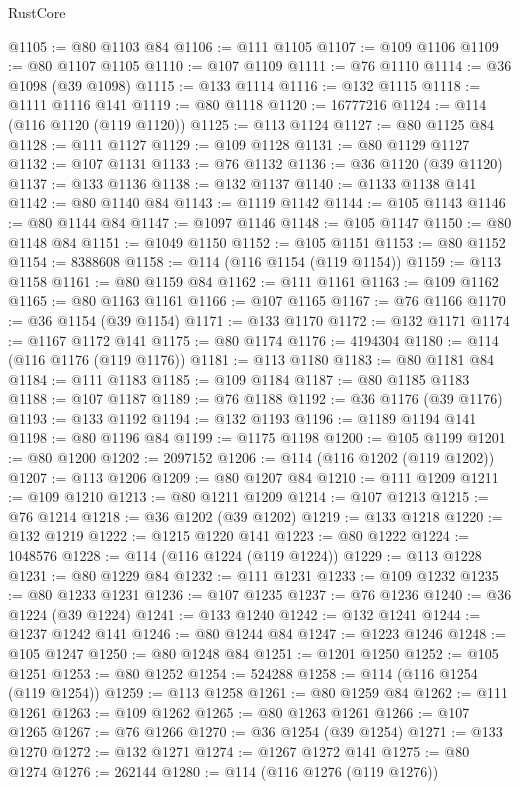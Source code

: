 \begin{lexlean}{RustCore}
\begin{coremodule}
@1105 := @80 @1103 @84
@1106 := @111 @1105
@1107 := @109 @1106
@1109 := @80 @1107 @1105
@1110 := @107 @1109
@1111 := @76 @1110
@1114 := @36 @1098 (@39 @1098)
@1115 := @133 @1114
@1116 := @132 @1115
@1118 := @1111 @1116 @141
@1119 := @80 @1118
@1120 := 16777216
@1124 := @114 (@116 @1120 (@119 @1120))
@1125 := @113 @1124
@1127 := @80 @1125 @84
@1128 := @111 @1127
@1129 := @109 @1128
@1131 := @80 @1129 @1127
@1132 := @107 @1131
@1133 := @76 @1132
@1136 := @36 @1120 (@39 @1120)
@1137 := @133 @1136
@1138 := @132 @1137
@1140 := @1133 @1138 @141
@1142 := @80 @1140 @84
@1143 := @1119 @1142
@1144 := @105 @1143
@1146 := @80 @1144 @84
@1147 := @1097 @1146
@1148 := @105 @1147
@1150 := @80 @1148 @84
@1151 := @1049 @1150
@1152 := @105 @1151
@1153 := @80 @1152
@1154 := 8388608
@1158 := @114 (@116 @1154 (@119 @1154))
@1159 := @113 @1158
@1161 := @80 @1159 @84
@1162 := @111 @1161
@1163 := @109 @1162
@1165 := @80 @1163 @1161
@1166 := @107 @1165
@1167 := @76 @1166
@1170 := @36 @1154 (@39 @1154)
@1171 := @133 @1170
@1172 := @132 @1171
@1174 := @1167 @1172 @141
@1175 := @80 @1174
@1176 := 4194304
@1180 := @114 (@116 @1176 (@119 @1176))
@1181 := @113 @1180
@1183 := @80 @1181 @84
@1184 := @111 @1183
@1185 := @109 @1184
@1187 := @80 @1185 @1183
@1188 := @107 @1187
@1189 := @76 @1188
@1192 := @36 @1176 (@39 @1176)
@1193 := @133 @1192
@1194 := @132 @1193
@1196 := @1189 @1194 @141
@1198 := @80 @1196 @84
@1199 := @1175 @1198
@1200 := @105 @1199
@1201 := @80 @1200
@1202 := 2097152
@1206 := @114 (@116 @1202 (@119 @1202))
@1207 := @113 @1206
@1209 := @80 @1207 @84
@1210 := @111 @1209
@1211 := @109 @1210
@1213 := @80 @1211 @1209
@1214 := @107 @1213
@1215 := @76 @1214
@1218 := @36 @1202 (@39 @1202)
@1219 := @133 @1218
@1220 := @132 @1219
@1222 := @1215 @1220 @141
@1223 := @80 @1222
@1224 := 1048576
@1228 := @114 (@116 @1224 (@119 @1224))
@1229 := @113 @1228
@1231 := @80 @1229 @84
@1232 := @111 @1231
@1233 := @109 @1232
@1235 := @80 @1233 @1231
@1236 := @107 @1235
@1237 := @76 @1236
@1240 := @36 @1224 (@39 @1224)
@1241 := @133 @1240
@1242 := @132 @1241
@1244 := @1237 @1242 @141
@1246 := @80 @1244 @84
@1247 := @1223 @1246
@1248 := @105 @1247
@1250 := @80 @1248 @84
@1251 := @1201 @1250
@1252 := @105 @1251
@1253 := @80 @1252
@1254 := 524288
@1258 := @114 (@116 @1254 (@119 @1254))
@1259 := @113 @1258
@1261 := @80 @1259 @84
@1262 := @111 @1261
@1263 := @109 @1262
@1265 := @80 @1263 @1261
@1266 := @107 @1265
@1267 := @76 @1266
@1270 := @36 @1254 (@39 @1254)
@1271 := @133 @1270
@1272 := @132 @1271
@1274 := @1267 @1272 @141
@1275 := @80 @1274
@1276 := 262144
@1280 := @114 (@116 @1276 (@119 @1276))

\end{coremodule}
\end{lexlean}
